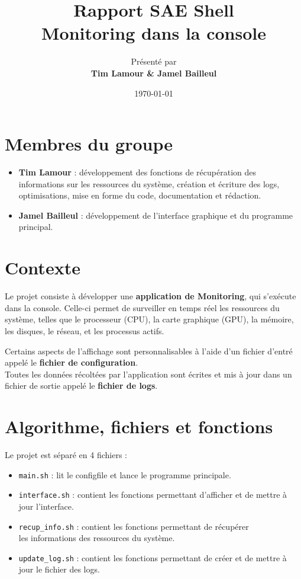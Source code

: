 \documentclass{article}
\title{\Huge \textbf{Rapport SAE Shell} \\[0.5cm] \Large Monitoring dans la console}
\author{\large Présenté par\\ \textbf{Tim Lamour \& Jamel Bailleul}}
\date{\today}
\begin{document}
\maketitle %
\tableofcontents %
\newpage

\section{Membres du groupe}
\begin{itemize}
    \item \textbf{Tim Lamour} : développement des fonctions de récupération des informations sur les ressources du système, création et écriture des logs, optimisations, mise en forme du code, documentation et rédaction.
    \item \textbf{Jamel Bailleul} : développement de l'interface graphique et du programme principal.

\end{itemize}

\section{Contexte}
Le projet consiste à développer une \textbf{application de Monitoring}, qui s'exécute dans la console.
Celle-ci permet de surveiller en temps réel les ressources du système, telles que le processeur (CPU), la carte graphique (GPU), la mémoire, les disques, le réseau, et les processus actifs.
\vspace{1em}

Certains aspects de l'affichage sont personnalisables à l'aide d'un fichier d'entré appelé le \textbf{fichier de configuration}.
\\
Toutes les données récoltées par l'application sont écrites et mis à jour dans un fichier de sortie appelé le \textbf{fichier de logs}.

\section{Algorithme, fichiers et fonctions}
Le projet est séparé en 4 fichiers :
\begin{itemize}
    \item \texttt{main.sh} : lit le configfile et lance le programme principale.
    \item \texttt{interface.sh} : contient les fonctions permettant d'afficher et de mettre à jour l'interface.
    \item \texttt{recup\_info.sh} : contient les fonctions permettant de récupérer\\ les informations des ressources du système.
    \item \texttt{update\_log.sh} : contient les fonctions permettant de créer et de mettre à jour le fichier des logs. 
\end{itemize}
\vspace{1em}
\end{document}

